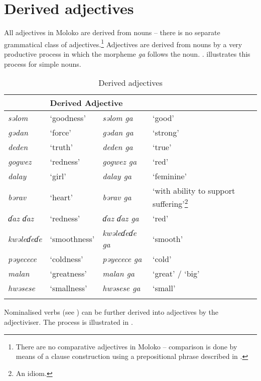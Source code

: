 \section{Derived adjectives}\label{sec:5.3} 
\hypertarget{RefHeading1211661525720847}{}
All adjectives in Moloko are derived from nouns -- there is no separate grammatical class of adjectives.\footnote{There are no comparative adjectives in Moloko -- comparison is done by means of a clause construction using a prepositional phrase described in .} Adjectives are derived from nouns by a very productive process in which the morpheme \textit{ga}  follows the noun.  . illustrates this process for simple nouns. 

\begin{table}
\begin{tabular}{l@{ }ll@{ }l}
\lsptoprule
\multicolumn{2}{l}{Noun} & \multicolumn{2}{l}{Derived Adjective}\\\midrule
\textit{səlom} & ‘goodness’  & \textit{səlom ga} & ‘good’ \\
\textit{gədan} & ‘force’ & \textit{gədan ga} & ‘strong’\\
\textit{deden} & ‘truth’ & \textit{deden ga} & ‘true’\\
\textit{gogwez} & ‘redness’ & \textit{gogwez ga} & ‘red’ \\
\textit{dalay} & ‘girl’ & \textit{dalay ga} & ‘feminine’\\
\textit{bərav} & ‘heart’ & \textit{bərav ga} & ‘with ability to support suffering’\footnote{An idiom.} \\
\textit{ɗaz ɗaz} & ‘redness’ & \textit{ɗaz ɗaz ga} & ‘red’ \\
\textit{kwəleɗeɗe} & ‘smoothness’ & \textit{kwəleɗeɗe ga} & ‘smooth’\\
\textit{pəyecece} & ‘coldness’ & \textit{pəyecece ga} & ‘cold’\\
\textit{malan} & ‘greatness’   & \textit{malan ga} & ‘great’ / ‘big’\\
\textit{hwəsese} & ‘smallness’ & \textit{hwəsese ga} & ‘small’\\
\lspbottomrule
\end{tabular}
\caption{Derived adjectives}\label{tab:35}
\end{table}

Nominalised verbs (see ) can be further derived into adjectives by the adjectiviser. The process is illustrated in .

